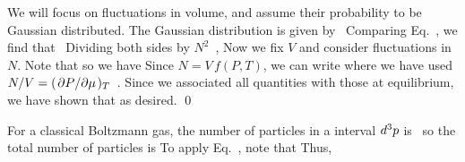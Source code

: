 \documentclass[11pt]{article}
\begin{document}
{	We will focus on fluctuations in volume, and assume their probability to be Gaussian distributed.  The Gaussian distribution is given by~\cite[p.~345]{Landau}
	Comparing Eq.~, we find that~\cite[p.~350]{Landau}
	Dividing both sides by $N^2$~\cite[p.~351]{Landau},
	Now we fix $V$ and consider fluctuations in $N$.  Note that
	so we have
	Since $N = V \,f(P, T)$, we can write
	where we have used $N / V = (\pdv*{P}{\mu})_T$~\cite[pp.~351--352]{Landau}.  Since we associated all quantities with those at equilibrium, we have shown that
	as desired. \qed
	
	For a classical Boltzmann gas, the number of particles in a interval $\dd[3]{p}$ is~\cite[pp.~108--109]{Landau}
	so the total number of particles is
	To apply Eq.~, note that
	Thus,
	
}
\end{document}
